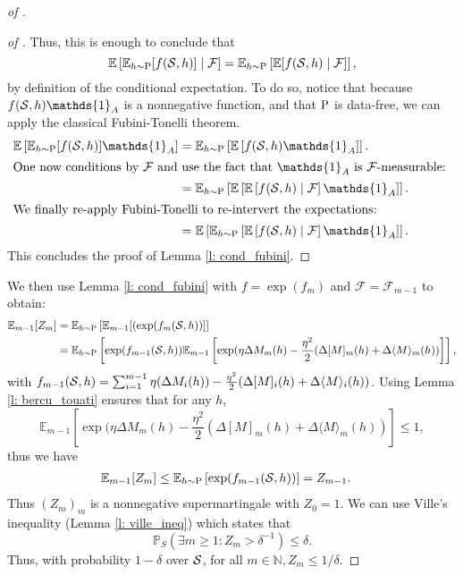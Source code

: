 \begin{proof}[of ]
\begin{proof}[of ]
Thus, this is enough to conclude that
\[ \mathbb{E}\left[\mathbb{E}_{h\sim \P} [f(\S,h)]\mid \mathcal{F} \right] = \mathbb{E}_{h\sim \P} \left[ \mathbb{E}[f(\S,h)\mid \mathcal{F}] \right],   \]
by definition of the conditional expectation.
To do so, notice that because $f(\S,h)\mathds{1}_A $ is a nonnegative function, and that $\P$ is data-free, we can apply the classical Fubini-Tonelli theorem.
\begin{align*}
\mathbb{E}\left[\mathbb{E}_{h\sim \P} [f(\S,h)]\mathds{1}_A \right]
&=  \mathbb{E}_{h\sim \P} \left[ \mathbb{E}\left[f(\S,h)\mathds{1}_A\right] \right]. \\
\intertext{One now conditions by $\mathcal{F}$ and use the fact that $\mathds{1}_A$ is $\mathcal{F}$-measurable:  }
&= \mathbb{E}_{h\sim \P} \left[ \mathbb{E}\left[\mathbb{E}\left[f(\S,h)\mid \mathcal{F}\right]\mathds{1}_A\right] \right]. \\
\intertext{We finally re-apply Fubini-Tonelli to re-intervert the expectations: }
&= \mathbb{E}\left[ \mathbb{E}_{h\sim \P}\left[\mathbb{E}\left[f(\S,h)\mid \mathcal{F}\right]\mathds{1}_A\right] \right].
\end{align*}
This concludes the proof of Lemma \ref{l: cond_fubini}.
\end{proof}
We then use Lemma \ref{l: cond_fubini} with $f=\exp(f_m)$ and $\mathcal{F}=\mathcal{F}_{m-1}$ to obtain:
\begin{align*}
\mathbb{E}_{m-1}[Z_m] & =  \mathbb{E}_{h\sim \P}\left[\mathbb{E}_{m-1}[(\exp (f_m(\S,h))] \right]\\
&= \mathbb{E}_{h\sim \P}\left[ \exp (f_{m-1}(\S,h)) \mathbb{E}_{m-1}\left[ \exp( \eta\Delta M_m(h)  - \frac{\eta^2}{2}(\Delta[M]_m
(h) + \Delta \langle M\rangle_m(h)) \right]   \right],
\end{align*}
with $f_{m-1}(\S,h) = \sum_{i=1}^{m-1} \eta(\Delta M_i(h) ) - \frac{\eta^2}{2}(\Delta[M]_i(h) + \Delta \langle M\rangle_i(h))$.
Using Lemma \ref{l: bercu_touati} ensures that for any $h$, $$\mathbb{E}_{m-1}[ \exp( \eta\Delta M_m(h)  - \frac{\eta^2}{2}(\Delta[M]_m(h) + \Delta \langle M\rangle_m(h)) ] \leq 1,$$
thus we have
\begin{align*}
\mathbb{E}_{m-1}[Z_m] & \leq  \mathbb{E}_{h\sim \P}\left[ \exp (f_{m-1}(\S,h))   \right]  = Z_{m-1}.
\end{align*}
Thus $(Z_m)_m$ is a nonnegative supermartingale with $Z_0=1$. We can use Ville's inequality (Lemma \ref{l: ville_ineq}) which states that
$$
\mathbb{P}_S\left(\exists m \geq 1: Z_{m}>\delta^{-1}\right) \leq \delta.
$$
Thus, with probability $1-\delta$ over $\S$, for all $m\in\mathbb{N}, Z_m \leq 1/\delta $.

\end{proof}
